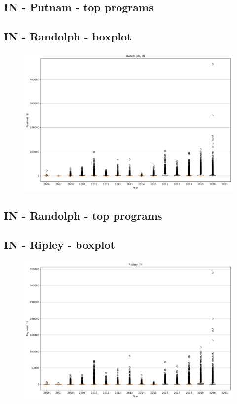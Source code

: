 \subsection*{IN - Putnam - top programs}

\newpage
\subsection*{IN - Randolph - boxplot}
\begin{figure}[h]
\centering
\includegraphics[width=7in]{../output/boxplots/counties/Randolph-IN_boxplot.png}
\end{figure}


\subsection*{IN - Randolph - top programs}

\newpage
\subsection*{IN - Ripley - boxplot}
\begin{figure}[h]
\centering
\includegraphics[width=7in]{../output/boxplots/counties/Ripley-IN_boxplot.png}
\end{figure}


